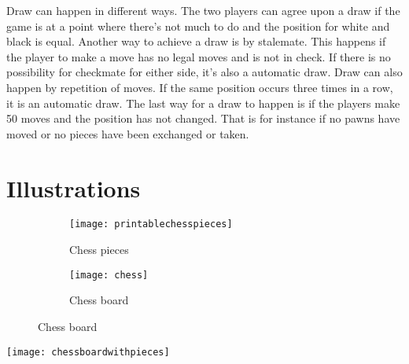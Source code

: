 \documentclass{article}
\begin{document}
\begin{description}[align=right]
\item [Draw:] \hspace{6mm} Draw can happen in different ways. The two players can agree upon a draw if the game is at a point where there's not much to do and the position for white and black is equal. Another way to achieve a draw is by stalemate. This happens if the player to make a move has no legal moves and is not in check. If there is no possibility for checkmate for either side, it's also a automatic draw. Draw can also happen by repetition of moves. If the same position occurs three times in a row, it is an automatic draw. The last way for a draw to happen is if the players make 50 moves and the position has not changed. That is for instance if no pawns have moved or no pieces have been exchanged or taken.
\end{description}

\section{Illustrations}
\begin{figure} [h!]
	\begin{subfigure}[b]{0.5\textwidth}
		\texttt{[image: printablechesspieces]}
        \caption{Chess pieces}
        \label{fig:printablechesspieces}
	\end{subfigure}
    \begin{subfigure}[b]{0.5\textwidth}
		\texttt{[image: chess]}
        \caption{Chess board}
        \label{fig:chess}
	\end{subfigure}

\end{figure}
\texttt{[image: chessboardwithpieces]}
\end{document}
